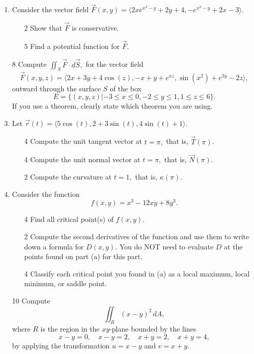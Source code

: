 \documentclass[addpoints,12pt]{exam}
\begin{document}
\begin{enumerate}
\newpage
\item Consider the vector field $\vec{F}(x,y) = \langle 2xe^{x^2-y} + 2y +4, -e^{x^2-y} + 2x-3
\rangle.$
\begin{itemize}
\item[2] Show that $\vec{F}$ is conservative.
\vfill
\item[5] Find a potential function for $\vec{F}.$
\vfill
\vfill
\vfill
\end{itemize}
\newpage
\item[8] Compute $\displaystyle\iint_{S} \vec{F} \cdot d{\vec{S}},$ for the vector field
$$\vec{F}(x,y,z) = \langle 2x + 3y+ 4\cos(z) , -x +y + e^{xz}, \sin(x^2) + e^{3y} - 2z \rangle, $$
outward through the surface $S$ of the box
$$ E = \{(x,y,z) | -3 \le x \le 0, -2\le y \le 1, 1\le z \le 6 \}.$$
If you use a theorem, clearly state which theorem you are using.
\newpage
\item Let $\vec{r}(t) = \langle 5\cos(t), 2+ 3\sin(t), 4\sin(t)+1 \rangle.$
\begin{itemize}
\item[4] Compute the unit tangent vector at $t=\pi,$ that is, \( \vec{T}(\pi) \).
\vfill
\item[4] Compute the unit normal vector at $t=\pi, $ that is, \( \vec{N}(\pi) \).
\vfill
\item[2] Compute the curvature at $t=1,$ that is, \( \kappa(\pi) \).
\vfill
\end{itemize}
\newpage
\item Consider the function
$$f(x,y) = x^3 -12xy +8y^3.$$
%
\begin{itemize}
\item[4]
Find all critical point(s) of $f(x,y)$.
\vfill
\vfill
\item[2] Compute the second derivatives of the function and use them to write down a formula
for $D(x,y).$ You do NOT need to evaluate $D$ at the points found on part (a) for this part.
\vfill
\vfill
\item[4]
Classify each critical point you found in (a) as a local maximum, local minimum, or saddle point.
\vfill
\vfill
\vfill
\end{itemize}
\newpage
\item[10] Compute $$\displaystyle\iint_{R}(x-y)^2\, dA,$$ where \( R \) is the region in the \(
xy \)-plane bounded by the lines
\[
x - y = 0, \quad x - y = 2, \quad x + y = 2, \quad x + y = 4,
\] by applying the transformation $u = x-y$ and $v = x+y$.

\end{enumerate}
\end{document}
